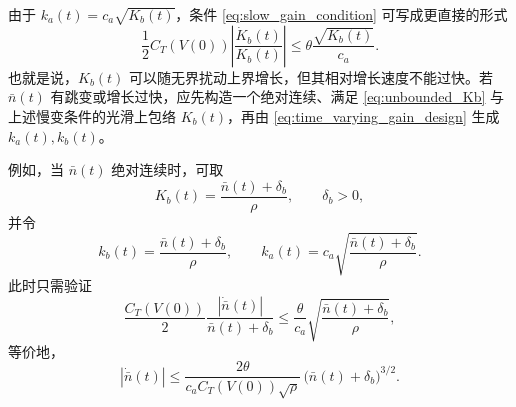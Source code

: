 由于 $k_a(t)=c_a\sqrt{K_b(t)}$，条件 \eqref{eq:slow_gain_condition} 可写成更直接的形式
\[
    \frac{1}{2}C_T(V(0))\left|\frac{\dot K_b(t)}{K_b(t)}\right|
    \le
    \theta\frac{\sqrt{K_b(t)}}{c_a}.
\]
也就是说，$K_b(t)$ 可以随无界扰动上界增长，但其相对增长速度不能过快。若 $\bar n(t)$ 有跳变或增长过快，应先构造一个绝对连续、满足 \eqref{eq:unbounded_Kb} 与上述慢变条件的光滑上包络 $K_b(t)$，再由 \eqref{eq:time_varying_gain_design} 生成 $k_a(t),k_b(t)$。

例如，当 $\bar n(t)$ 绝对连续时，可取
\[
    K_b(t)=\frac{\bar n(t)+\delta_b}{\rho},\qquad
    \delta_b>0,
\]
并令
\[
    k_b(t)=\frac{\bar n(t)+\delta_b}{\rho},\qquad
    k_a(t)=c_a\sqrt{\frac{\bar n(t)+\delta_b}{\rho}}.
\]
此时只需验证
\[
    \frac{C_T(V(0))}{2}
    \frac{|\dot{\bar n}(t)|}{\bar n(t)+\delta_b}
    \le
    \frac{\theta}{c_a}
    \sqrt{\frac{\bar n(t)+\delta_b}{\rho}},
\]
等价地，
\[
    |\dot{\bar n}(t)|
    \le
    \frac{2\theta}{c_a C_T(V(0))\sqrt{\rho}}\,
    \bigl(\bar n(t)+\delta_b\bigr)^{3/2}.
\]
